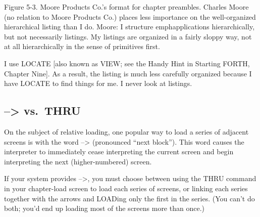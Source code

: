 Figure 5-3. Moore Products Co.'s format for chapter preambles.
Charles Moore (no relation to Moore Products Co.) places less importance
on the well-organized hierarchical listing than I do.  Moore:
I structure emph{applications} hierarchically, but not necessarily listings.  My
listings are organized in a fairly sloppy way, not at all hierarchically in the
sense of primitives first.

I use LOCATE [also known as VIEW; see the Handy Hint in Starting
FORTH, Chapter Nine].  As a result, the listing is much less carefully organized
because I have LOCATE to find things for me.  I never look at listings.
\subsection{--> vs.\ THRU}

On the subject of relative loading, one popular way to load a series of adjacent
screens is with the word --> (pronounced ``next block'').  This word
causes the interpreter to immediately cease interpreting the current
screen and begin interpreting the next (higher-numbered) screen.

If your system provides -->, you must choose between using the
THRU command in your chapter-load screen to load each series of
screens, or linking each series together with the arrows and LOADing
only the first in the series.  (You can't do both; you'd end up loading most
of the screens more than once.)

